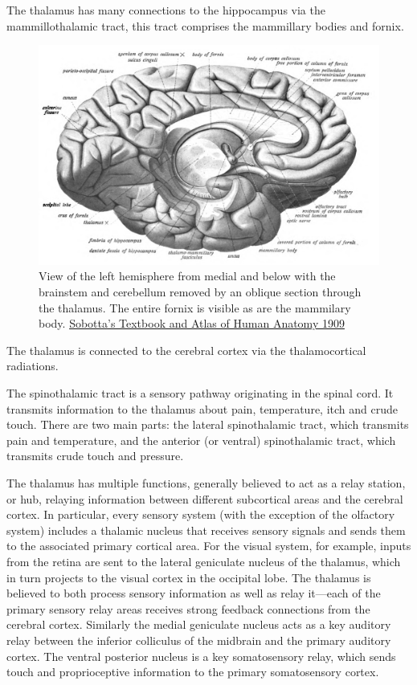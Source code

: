 The thalamus has many connections to the hippocampus via the mammillothalamic tract, this tract comprises the mammillary bodies and fornix.



\begin{figure}

{\centering \includegraphics[width=0.7\linewidth]{./figures/cns/Sobo_1909_634} 

}

\caption{View of the left hemisphere from medial and below with the brainstem and cerebellum removed by an oblique section through the thalamus. The entire fornix is visible as are the mammilary body. \href{https://commons.wikimedia.org/wiki/File:Sobo_1909_634.png}{Sobotta's Textbook and Atlas of Human Anatomy 1909}}\label{fig:thalamusview}
\end{figure}

The thalamus is connected to the cerebral cortex via the thalamocortical radiations.

The spinothalamic tract is a sensory pathway originating in the spinal cord. It transmits information to the thalamus about pain, temperature, itch and crude touch. There are two main parts: the lateral spinothalamic tract, which transmits pain and temperature, and the anterior (or ventral) spinothalamic tract, which transmits crude touch and pressure.

The thalamus has multiple functions, generally believed to act as a relay station, or hub, relaying information between different subcortical areas and the cerebral cortex. In particular, every sensory system (with the exception of the olfactory system) includes a thalamic nucleus that receives sensory signals and sends them to the associated primary cortical area. For the visual system, for example, inputs from the retina are sent to the lateral geniculate nucleus of the thalamus, which in turn projects to the visual cortex in the occipital lobe. The thalamus is believed to both process sensory information as well as relay it---each of the primary sensory relay areas receives strong feedback connections from the cerebral cortex. Similarly the medial geniculate nucleus acts as a key auditory relay between the inferior colliculus of the midbrain and the primary auditory cortex. The ventral posterior nucleus is a key somatosensory relay, which sends touch and proprioceptive information to the primary somatosensory cortex.


